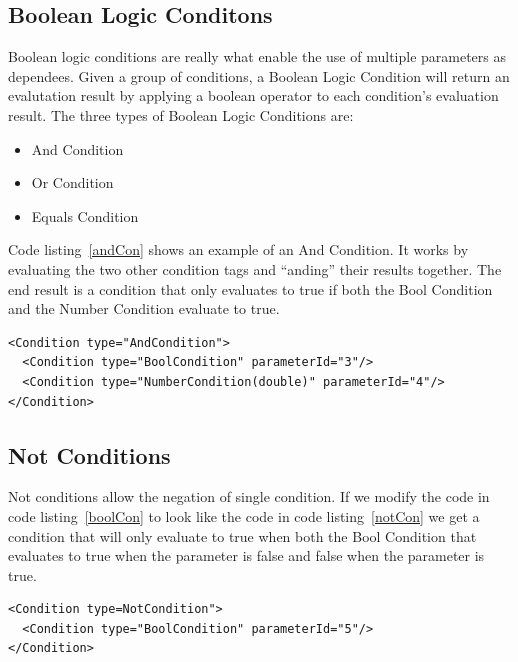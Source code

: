 \subsection{Boolean Logic Conditons}
Boolean logic conditions are really what enable the use of multiple parameters as dependees. Given a group of conditions, a Boolean Logic Condition will return an evalutation 
result by applying a boolean operator to each condition's evaluation result. The three types of Boolean Logic Conditions are:
\begin{itemize}
\item And Condition
\item Or Condition
\item Equals Condition
\end{itemize}

Code listing~\ref{andCon} shows an example of an And Condition. It works by evaluating the two other condition tags and ``anding'' their results together. The end result is a
condition that only evaluates to true if both the Bool Condition and the Number Condition evaluate to true.
\begin{lstlisting}[caption={Example of an And Condition}, label=andCon]
<Condition type="AndCondition">
  <Condition type="BoolCondition" parameterId="3"/>
  <Condition type="NumberCondition(double)" parameterId="4"/>
</Condition>
\end{lstlisting}

\subsection{Not Conditions}
Not conditions allow the negation of single condition. If we modify the code in code listing~\ref{boolCon} to look like the code in code listing~\ref{notCon} we get a 
condition that will only evaluate to true when both the Bool Condition that evaluates to true when the parameter is false and false when the parameter is true. 
\begin{lstlisting}[caption={Example of a Not Condition}, label=notCon]
<Condition type=NotCondition">
  <Condition type="BoolCondition" parameterId="5"/>
</Condition>
\end{lstlisting}

